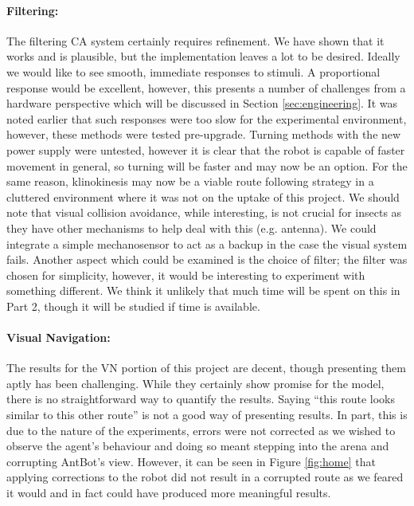 \documentclass[a4paper,11pt,twoside,openright]{article}
\begin{document}
\paragraph{Filtering:}
The filtering CA system certainly requires refinement. We have shown that it works and is plausible, but
the implementation leaves a lot to be desired. Ideally we would like to see smooth, immediate responses
to stimuli. A proportional response would be excellent, however, this presents a number of challenges
from a hardware perspective which will be discussed in Section \ref{sec:engineering}. It was noted earlier
that such responses were too slow for the experimental environment, however, these methods were tested
pre-upgrade. Turning methods with the new power supply were untested, however it is clear that the robot
is capable of faster movement in general, so turning will be faster and may now be an option. For the
same reason, klinokinesis may now be a viable route following strategy in a cluttered environment where
it was not on the uptake of this project. We should note that visual collision avoidance, while interesting,
is not crucial for insects as they have other mechanisms to help deal with this (e.g. antenna). We could
integrate a simple mechanosensor to act as a backup in the case the visual system fails. Another aspect
which could be examined is the choice of filter; the filter was chosen for simplicity, however, it
would be interesting to experiment with something different. We think it unlikely that much time
will be spent on this in Part 2, though it will be studied if time is available.
\newline

\paragraph{Visual Navigation:}
The results for the VN portion of this project are decent, though presenting them aptly has been
challenging. While they certainly show promise for the model,
there is no straightforward way to quantify the results. Saying ``this route looks similar to this other route'' is
not a good way of presenting results. In part, this is due to the nature of the experiments, errors were
not corrected as we wished to observe the agent's behaviour and doing so meant stepping into the arena and
corrupting AntBot's view. However, it can
be seen in Figure \ref{fig:home} that applying corrections to the robot did not result in a corrupted route
as we feared it would
and in fact could have produced more meaningful results.
\newline
\end{document}
